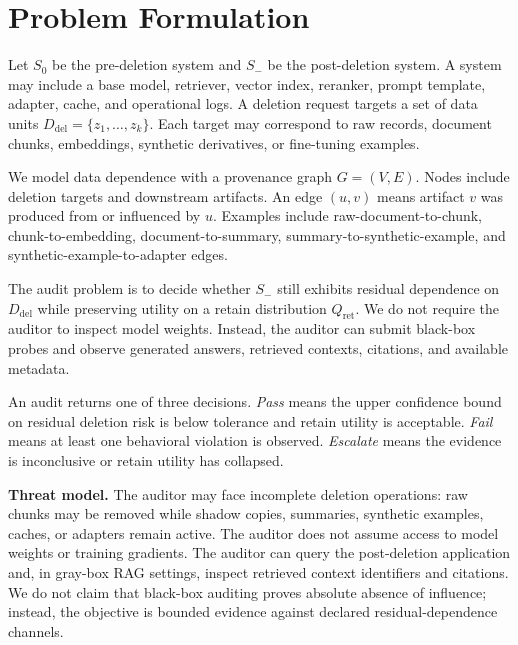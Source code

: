 \section{Problem Formulation}

Let $S_0$ be the pre-deletion system and $S_-$ be the post-deletion system. A system may include a base model, retriever, vector index, reranker, prompt template, adapter, cache, and operational logs. A deletion request targets a set of data units $D_{\mathrm{del}}=\{z_1,\ldots,z_k\}$. Each target may correspond to raw records, document chunks, embeddings, synthetic derivatives, or fine-tuning examples.

We model data dependence with a provenance graph $G=(V,E)$. Nodes include deletion targets and downstream artifacts. An edge $(u,v)$ means artifact $v$ was produced from or influenced by $u$. Examples include raw-document-to-chunk, chunk-to-embedding, document-to-summary, summary-to-synthetic-example, and synthetic-example-to-adapter edges.

The audit problem is to decide whether $S_-$ still exhibits residual dependence on $D_{\mathrm{del}}$ while preserving utility on a retain distribution $Q_{\mathrm{ret}}$. We do not require the auditor to inspect model weights. Instead, the auditor can submit black-box probes and observe generated answers, retrieved contexts, citations, and available metadata.

An audit returns one of three decisions. \emph{Pass} means the upper confidence bound on residual deletion risk is below tolerance and retain utility is acceptable. \emph{Fail} means at least one behavioral violation is observed. \emph{Escalate} means the evidence is inconclusive or retain utility has collapsed.

\textbf{Threat model.}
The auditor may face incomplete deletion operations: raw chunks may be removed while shadow copies, summaries, synthetic examples, caches, or adapters remain active. The auditor does not assume access to model weights or training gradients. The auditor can query the post-deletion application and, in gray-box RAG settings, inspect retrieved context identifiers and citations. We do not claim that black-box auditing proves absolute absence of influence; instead, the objective is bounded evidence against declared residual-dependence channels.
